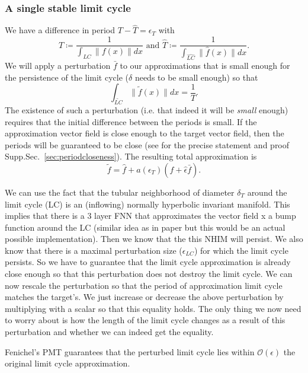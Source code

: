 \documentclass{article}
\theoremstyle{definition}
\theoremstyle{remark}
\newcounter{ct}
\begin{document}
\subsubsection{A single stable limit cycle}
We have a difference in period $T-\hat T = \epsilon_T$
with \[T\coloneqq\frac{1}{\int_{LC}\|f(x)\|dx} \text{ and } \hat T\coloneqq\frac{1}{\int_{\hat{LC}}\|\hat f(x)\|dx}.\]
%
We will apply a perturbation $\bar{f}$ to our approximations that is small enough for the persistence of the limit cycle ($\delta$ needs to be small enough) 
so that 
\[\int_{\tilde{LC}}\|\tilde{f}(x)\| dx = \frac{1}{T}. 	\]%
The existence of such a perturbation (i.e. that indeed it will be \emph{small} enough) requires that the initial difference between the periods is small.
If the approximation vector field is close enough to the target vector field, then the periods will be guaranteed to be close (see for the precise statement and proof Supp.Sec.~\ref{sec:periodcloseness}).
The resulting total approximation is \[\tilde{f}=%
 \hat{f} + a(\epsilon_T)(\hat{f} + \hat{\epsilon}\bar{f}).\]


We can use the fact that the tubular neighborhood of diameter $\delta_T$ around the limit cycle (LC) is an (inflowing) normally hyperbolic invariant manifold.
This implies that there is a 3 layer FNN that approximates the vector field x a bump function around the LC (similar idea as in paper but this would be an actual possible implementation).
Then we know that the this NHIM will persist.
We also know that there is a maximal perturbation size ($\epsilon_{LC}$) for which the limit cycle persists.
So we have to guarantee that the limit cycle approximation is already close enough so that this perturbation does not destroy the limit cycle.
We can now rescale the perturbation so that the period of approximation limit cycle matches the target's. 
We just increase or decrease  the above perturbation by multiplying with a scalar so that this equality holds.
The only thing we now need to worry about is how the length of the limit cycle changes as a result of this perturbation and whether we can indeed get the equality.

Fenichel's PMT guarantees that the perturbed limit cycle lies within $\mathcal{O}(\epsilon)$ the original limit cycle approximation.

\end{document}
